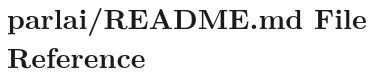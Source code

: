 \hypertarget{parlai_2README_8md}{}\section{parlai/\+R\+E\+A\+D\+ME.md File Reference}
\label{parlai_2README_8md}
